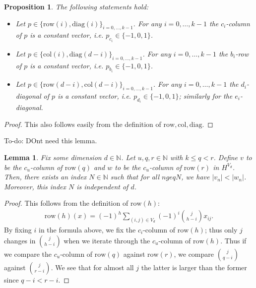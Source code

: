 \documentclass[11pt]{article}
\newtheorem{proposition}[theorem]{Proposition}
\newtheorem{lemma}[theorem]{Lemma}
\begin{document}
\begin{proposition}
  The following statements hold:
  \begin{itemize}
  \item Let $p \in \{ \mathrm{row}(i), \mathrm{diag}(i) \}_{i = 0, \dots, k-1}$. For any $i = 0, \dots, k-1$ the $c_{i}$-column of $p$ is a constant vector, i.e. $p_{c_{i}} \in \{ -1, 0, 1 \}$. 

  \item Let $p \in \{ \mathrm{col}(i), \mathrm{diag}(d-i) \}_{i = 0, \dots, k-1}$. For any $i = 0, \dots, k-1$ the $b_{i}$-row of $p$ is a constant vector, i.e. $p_{b_{i}} \in \{ -1, 0, 1 \}$. 

  \item Let $p \in \{ \mathrm{row}(d-i), \mathrm{col}(d-i) \}_{i = 0, \dots, k-1}$. For any $i = 0, \dots, k-1$ the $d_{i}$-diagonal of $p$ is a constant vector, i.e. $p_{d_{i}} \in \{ -1, 0, 1 \}$; similarly for the $e_{i}$-diagonal. 
  \end{itemize}
\end{proposition}

\begin{proof}
  This also follows easily from the definition of $\mathrm{row}, \mathrm{col}, \mathrm{diag}$. 
\end{proof}

To-do: DOnt need this lemma.
\begin{lemma}
  Fix some dimension $d \in \mathbb{N}$. Let $u, q,r \in \mathbb{N}$ with $k \leq q < r$. Define $v$ to be the $c_{u}$-column of $\mathrm{row}(q)$ and $w$ to be the $c_{u}$-column of $\mathrm{row}(r)$ in $H^{V_{d}}$. Then, there exists an index $N \in \mathbb{N}$ such that for all $n geq N$, we have $\lvert v_{n} \rvert < \lvert w_{n} \rvert$. Moreover, this index $N$ is independent of $d$.
\end{lemma}

\begin{proof}
  This follows from the definition of $\mathrm{row}(h)$:
  \begin{align*}
    \mathrm{row}(h)(x) = (-1)^{h} \sum_{(i,j) \in V_{d}} (-1)^i {j \choose h-i} x_{ij}. 
  \end{align*}
  By fixing $i$ in the formula above, we fix the $c_{i}$-column of $\mathrm{row}(h)$; thus only $j$ changes in ${j \choose h-i}$ when we iterate through the $c_{u}$-column of $\mathrm{row}(h)$. Thus if we compare the $c_{u}$-column of $\mathrm{row}(q)$ against $\mathrm{row}(r)$, we compare ${j \choose q-i}$ against ${j \choose r-i}$. We see that for almost all $j$ the latter is larger than the former since $q-i < r -i$.
\end{proof}
\end{document}

